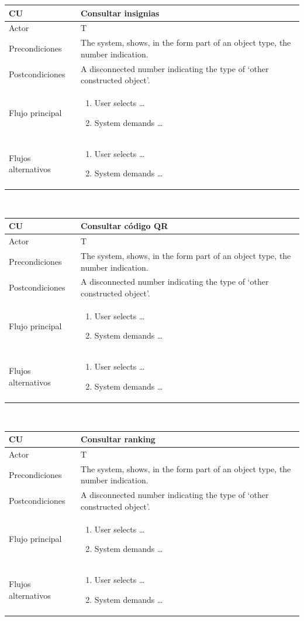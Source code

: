 \documentclass[twoside]{report}
\newcommand\addrow[2]{#1 &#2\\ }
\newcommand\addheading[2]{#1 &#2\\ \hline}
\newcommand\tabularhead{\begin{tabular}{lp{0.7\textwidth}}
\hline
}
\newcommand\addmulrow[2]{ \begin{minipage}[t][][t]{2.5cm}#1\end{minipage}%
   &\begin{minipage}[t][][t]{8cm}
    \begin{enumerate} #2   \end{enumerate}
    \end{minipage}\\ }
\newenvironment{usecase}{\tabularhead}
{\hline\end{tabular}}
\begin{document}
\begin{usecase}
  \addheading{\textbf{CU\arabic{usecase}}}{Consultar insignias} 
  \addrow{Actor}{T}
  \addrow{Precondiciones}{The system, shows, in the form part of an object type, the number indication.}
  \addrow{Postcondiciones}{A disconnected number indicating the type of `other constructed object'.}
  \addmulrow{Flujo principal}{
  		\item User selects \ldots
        \item System demands \ldots
  }
  \addmulrow{Flujos alternativos}{
  		\item User selects \ldots
        \item System demands \ldots
  }
\end{usecase}\\

\begin{usecase}
  \addheading{\textbf{CU\arabic{usecase}}}{Consultar código QR} 
  \addrow{Actor}{T}
  \addrow{Precondiciones}{The system, shows, in the form part of an object type, the number indication.}
  \addrow{Postcondiciones}{A disconnected number indicating the type of `other constructed object'.}
  \addmulrow{Flujo principal}{
  		\item User selects \ldots
        \item System demands \ldots
  }
  \addmulrow{Flujos alternativos}{
  		\item User selects \ldots
        \item System demands \ldots
  }
\end{usecase}\\

\begin{usecase}
  \addheading{\textbf{CU\arabic{usecase}}}{Consultar ranking} 
  \addrow{Actor}{T}
  \addrow{Precondiciones}{The system, shows, in the form part of an object type, the number indication.}
  \addrow{Postcondiciones}{A disconnected number indicating the type of `other constructed object'.}
  \addmulrow{Flujo principal}{
  		\item User selects \ldots
        \item System demands \ldots
  }
  \addmulrow{Flujos alternativos}{
  		\item User selects \ldots
        \item System demands \ldots
  }
\end{usecase}\\
\end{document}
